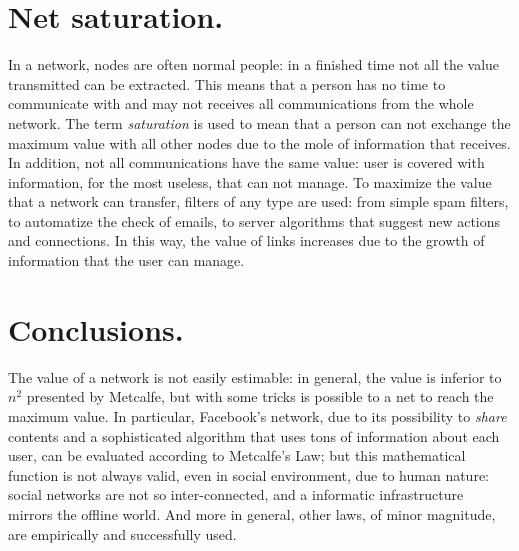 \documentclass[12pt, a4page]{article}
\begin{document}
\section{Net saturation.}
In a network, nodes are often normal people: in a finished time not all the value transmitted can be extracted.
This means that a person has no time to communicate with and may not receives all communications from the whole network.
The term \textit{saturation} is used to mean that a person can not exchange the maximum value with all other nodes due to the mole of information that receives.
In addition, not all communications have the same value: user is covered with information, for the most useless, that can not manage. \newline
To maximize the value that a network can transfer, filters of any type are used: from simple spam filters, to automatize the check of emails, to server algorithms that suggest new actions and connections.
In this way, the value of links increases due to the growth of information that the user can manage. \newline

\section{Conclusions.}
The value of a network is not easily estimable: in general, the value is inferior to $n^2$ presented by Metcalfe, but with some tricks is possible to a net to reach the maximum value.
In particular, Facebook's network, due to its possibility to \textit{share} contents and a sophisticated algorithm that uses tons of information about each user, can be evaluated according to Metcalfe's Law; but this mathematical function is not always valid, even in social environment, due to human nature: social networks are not so inter-connected, and a informatic infrastructure mirrors the offline world. 
And more in general, other laws, of minor magnitude, are empirically and successfully used.
\newpage
\printbibliography
\end{document}
